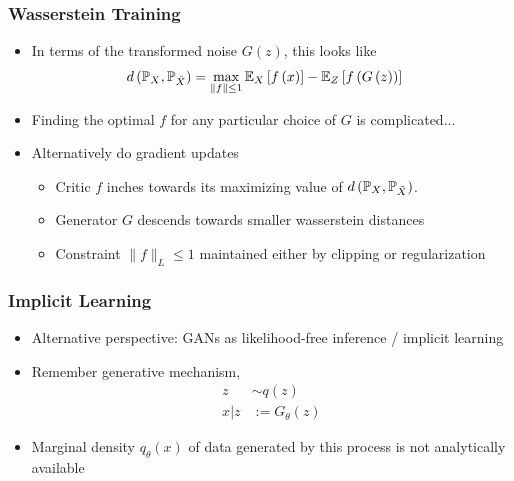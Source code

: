 \documentclass[10pt,mathserif]{beamer}
\begin{document}
\begin{frame}
  \frametitle{Wasserstein Training}
  \begin{itemize}
  \item In terms of the transformed noise $G\left(z\right)$, this looks like
    \begin{align*}
      d\left(\P_{X}, \P_{\tilde{X}}\right) &= \max_{\|f\| \leq 1} \Esubarg{X}{f\left(x\right)} - \Esubarg{Z}{f\left(G\left(z\right)\right)}
    \end{align*}
  \item Finding the optimal $f$ for any particular choice of $G$ is complicated...
  \item Alternatively do gradient updates
  \begin{itemize}
  \item Critic $f$ inches towards its maximizing value of $d\left(\P_{X},
    \P_{\tilde{X}}\right)$.
  \item Generator $G$ descends towards smaller wasserstein distances
  \item Constraint $\|f\|_{L} \leq 1$ maintained either by clipping or
    regularization
  \end{itemize}
\end{itemize}
\end{frame}

\begin{frame}
  \frametitle{Implicit Learning}
  \begin{itemize}
  \item Alternative perspective: GANs as likelihood-free inference / implicit
    learning
  \item Remember generative mechanism,
    \begin{align*}
      z &\sim q\left(z\right) \\
      x \vert z &:= G_{\theta}\left(z\right)
    \end{align*}
  \item Marginal density $q_{\theta}\left(x\right)$ of data generated by this
    process is not analytically available
  \end{itemize}
\end{frame}
\end{document}
